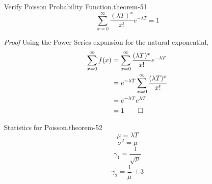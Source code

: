 \documentclass[10pt,]{book}
\makeatletter
\renewcommand*{\proofname}{Proof}
\renewenvironment{proof}[1][\proofname]{\par
  \pushQED{\qed}%
  \normalfont \topsep6\p@\@plus6\p@\relax
  \trivlist
  \item\relax
    {\itshape
    #1\@addpunct{.}}\hspace\labelsep\ignorespaces
}{%
  \popQED\endtrivlist\@endpefalse
}
\numberwithin{equation}{section}
\makeatother
\begin{document}
%
\par
\hypertarget{p-952}{}%
\begin{theorem}{Verify Poisson Probability Function.}{}{theorem-51}%
\hypertarget{p-953}{}%
%
\begin{equation*}
\sum_{x=0}^{\infty} \frac{(\lambda T)^x}{x!} e^{-\lambda T} = 1
\end{equation*}
%
\end{theorem}
\begin{proof}\hypertarget{proof-53}{}
\hypertarget{p-954}{}%
Using the Power Series expansion for the natural exponential,%
\begin{align*}
\sum_{x=0}^{\infty} f(x) & = \sum_{x=0}^{\infty} \frac{(\lambda T)^x}{x!} e^{-\lambda T} \\
& = e^{-\lambda T} \sum_{x=0}^{\infty} \frac{(\lambda T)^x}{x!} \\
& = e^{-\lambda T} e^{\lambda T}  \\
& = 1\qedhere
\end{align*}
%
\end{proof}
%
\par
\hypertarget{p-955}{}%
\begin{theorem}{Statistics for Poisson.}{}{theorem-52}%
\hypertarget{p-956}{}%
%
\begin{equation*}
\mu = \lambda T
\end{equation*}
%
\begin{equation*}
\sigma^2 = \mu
\end{equation*}
%
\begin{equation*}
\gamma_1 = \frac{1}{\sqrt{\mu}}
\end{equation*}
%
\begin{equation*}
\gamma_2 = \frac{1}{\mu}+3
\end{equation*}
%
\end{theorem}
\end{document}
